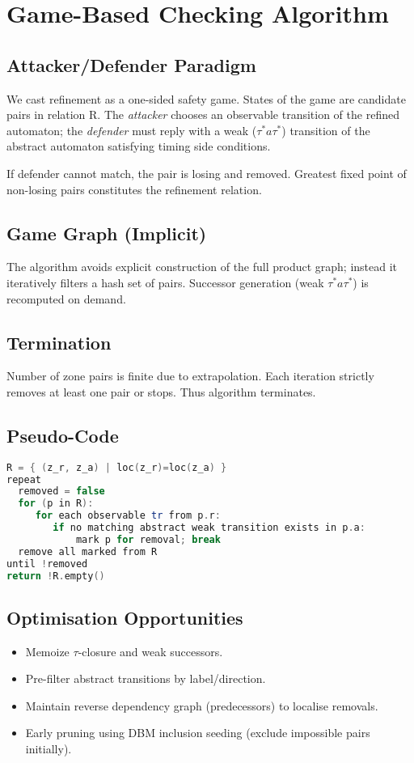 \section{Game-Based Checking Algorithm}
\subsection{Attacker/Defender Paradigm}
We cast refinement as a one-sided safety game. States of the game are candidate pairs in relation R. The \emph{attacker} chooses an observable transition of the refined automaton; the \emph{defender} must reply with a weak ($\tau^* a \tau^*$) transition of the abstract automaton satisfying timing side conditions.

If defender cannot match, the pair is losing and removed. Greatest fixed point of non-losing pairs constitutes the refinement relation.

\subsection{Game Graph (Implicit)}
The algorithm avoids explicit construction of the full product graph; instead it iteratively filters a hash set of pairs. Successor generation (weak $\tau^* a \tau^*$) is recomputed on demand.

\subsection{Termination}
Number of zone pairs is finite due to extrapolation. Each iteration strictly removes at least one pair or stops. Thus algorithm terminates.

\subsection{Pseudo-Code}
\begin{lstlisting}[language=C++]
R = { (z_r, z_a) | loc(z_r)=loc(z_a) }
repeat
  removed = false
  for (p in R):
     for each observable tr from p.r:
        if no matching abstract weak transition exists in p.a:
            mark p for removal; break
  remove all marked from R
until !removed
return !R.empty()
\end{lstlisting}

\subsection{Optimisation Opportunities}
\begin{itemize}
  \item Memoize $\tau$-closure and weak successors.
  \item Pre-filter abstract transitions by label/direction.
  \item Maintain reverse dependency graph (predecessors) to localise removals.
  \item Early pruning using DBM inclusion seeding (exclude impossible pairs initially).
\end{itemize}


